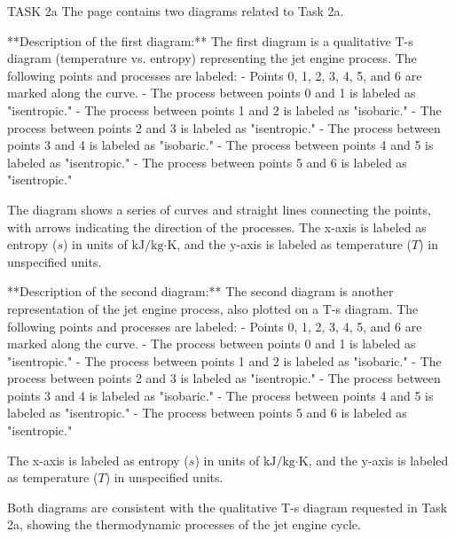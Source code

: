 TASK 2a  
The page contains two diagrams related to Task 2a.  

**Description of the first diagram:**  
The first diagram is a qualitative T-s diagram (temperature vs. entropy) representing the jet engine process. The following points and processes are labeled:  
- Points 0, 1, 2, 3, 4, 5, and 6 are marked along the curve.  
- The process between points 0 and 1 is labeled as "isentropic."  
- The process between points 1 and 2 is labeled as "isobaric."  
- The process between points 2 and 3 is labeled as "isentropic."  
- The process between points 3 and 4 is labeled as "isobaric."  
- The process between points 4 and 5 is labeled as "isentropic."  
- The process between points 5 and 6 is labeled as "isentropic."  

The diagram shows a series of curves and straight lines connecting the points, with arrows indicating the direction of the processes. The x-axis is labeled as entropy (\( s \)) in units of \( \text{kJ}/\text{kg·K} \), and the y-axis is labeled as temperature (\( T \)) in unspecified units.  

**Description of the second diagram:**  
The second diagram is another representation of the jet engine process, also plotted on a T-s diagram. The following points and processes are labeled:  
- Points 0, 1, 2, 3, 4, 5, and 6 are marked along the curve.  
- The process between points 0 and 1 is labeled as "isentropic."  
- The process between points 1 and 2 is labeled as "isobaric."  
- The process between points 2 and 3 is labeled as "isentropic."  
- The process between points 3 and 4 is labeled as "isobaric."  
- The process between points 4 and 5 is labeled as "isentropic."  
- The process between points 5 and 6 is labeled as "isentropic."  

The x-axis is labeled as entropy (\( s \)) in units of \( \text{kJ}/\text{kg·K} \), and the y-axis is labeled as temperature (\( T \)) in unspecified units.  

Both diagrams are consistent with the qualitative T-s diagram requested in Task 2a, showing the thermodynamic processes of the jet engine cycle.